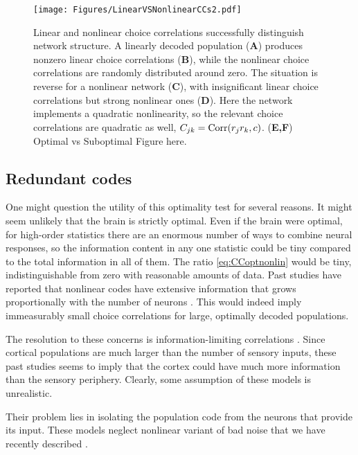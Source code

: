 \documentclass[11pt,twocolumn]{article}
\begin{document}
\begin{figure}[hbtp]
  \centering
  \texttt{[image: Figures/LinearVSNonlinearCCs2.pdf]}
  \caption{Linear and nonlinear choice correlations successfully distinguish network structure. A linearly decoded population ({\bf A}) produces nonzero linear choice correlations ({\bf B}), while the nonlinear choice correlations are randomly distributed around zero. The situation is reverse for a nonlinear network ({\bf C}), with insignificant linear choice correlations but strong nonlinear ones ({\bf D}). Here the network implements a quadratic nonlinearity, so the relevant choice correlations are quadratic as well, $C_{jk}={\rm Corr}(r_jr_k,c)$. ({\bf E,F}) {\color{red} Optimal vs Suboptimal Figure here.}}
  \label{fig:nonlinearCCs}
\end{figure}



\subsection{Redundant codes}

One might question the utility of this optimality test for several reasons. It might seem unlikely that the brain is strictly optimal. Even if the brain were optimal, for high-order statistics there are an enormous number of ways to combine neural responses, so the information content in any one statistic could be tiny compared to the total information in all of them. The ratio \ref{eq:CCoptnonlin} would be tiny, indistinguishable from zero with reasonable amounts of data. Past studies have reported that nonlinear codes have extensive information that grows proportionally with the number of neurons \cite{shamir2006implications,ecker2011effect}. This would indeed imply immeasurably small choice correlations for large, optimally decoded populations.

The resolution to these concerns is information-limiting correlations \cite{}. Since cortical populations are much larger than the number of sensory inputs, these past studies seems to imply that the cortex could have much more information than the sensory periphery. Clearly, some assumption of these models is unrealistic.

Their problem lies in isolating the population code from the neurons that provide its input. These models neglect nonlinear variant of bad noise that we have recently described \cite{Yang2015Nonlinear}.
\end{document}
